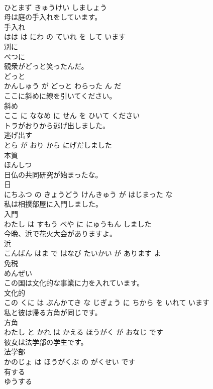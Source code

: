 \documentclass[8pt]{extreport}
\begin{document}
\begin{CJK}{UTF8}{min}
\\	ひとまず きゅうけい しましょう			
\\	母は庭の手入れをしています。	
\\	手入れ 
\\	はは は にわ の ていれ を して います			
\\	別に	
\\	べつに			
\\	観衆がどっと笑ったんだ。	
\\	どっと 
\\	かんしゅう が どっと わらった ん だ			
\\	ここに斜めに線を引いてください。	
\\	斜め 
\\	ここ に ななめ に せん を ひいて ください			
\\	トラがおりから逃げ出しました。	
\\	逃げ出す 
\\	とら が おり から にげだしました			
\\	本質	
\\	ほんしつ			
\\	日仏の共同研究が始まったな。	
\\	日 
\\	にちふつ の きょうどう けんきゅう が はじまった な			
\\	私は相撲部屋に入門しました。	
\\	入門 
\\	わたし は すもう べや に にゅうもん しました			
\\	今晩、浜で花火大会がありますよ。	
\\	浜 
\\	こんばん はま で はなび たいかい が あります よ			
\\	免税	
\\	めんぜい			
\\	この国は文化的な事業に力を入れています。	
\\	文化的 
\\	この くに は ぶんかてき な じぎょう に ちから を いれて います			
\\	私と彼は帰る方角が同じです。	
\\	方角 
\\	わたし と かれ は かえる ほうがく が おなじ です			
\\	彼女は法学部の学生です。	
\\	法学部 
\\	かのじょ は ほうがくぶ の がくせい です			
\\	有する	
\\	ゆうする			

\end{CJK}
\end{document}

